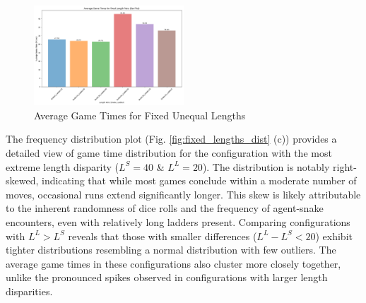 \documentclass[12pt]{report}
\begin{document}
	\begin{figure}[th]
		\centering
		\includegraphics[width=0.5\textwidth]{"../Chapter 2/withLength/UnequalLengths/approach_1_fixed_length_pairs_barplot"}
		\caption{Average Game Times for Fixed Unequal Lengths}
		\label{fig:approach1fixedlengthpairsbarplot}
	\end{figure}
	
	The frequency distribution plot (Fig. \ref{fig:fixed_lengths_dist} (c)) provides a detailed view of game time distribution for the configuration with the most extreme length disparity ($L^S = 40$ \& $L^L = 20$). The distribution is notably right-skewed, indicating that while most games conclude within a moderate number of moves, occasional runs extend significantly longer. This skew is likely attributable to the inherent randomness of dice rolls and the frequency of agent-snake encounters, even with relatively long ladders present. Comparing configurations with $L^L > L^S$ reveals that those with smaller differences ($L^L - L^S < 20$) exhibit tighter distributions resembling a normal distribution with few outliers. The average game times in these configurations also cluster more closely together, unlike the pronounced spikes observed in configurations with larger length disparities.
	
\end{document}
